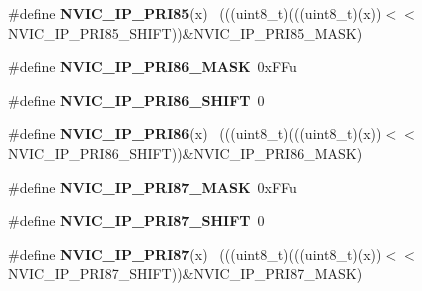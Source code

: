 \begin{DoxyCompactItemize}
\item 
\hypertarget{group___n_v_i_c___register___masks_ga6d9ceb14c27dc652c88da810f79b3d3e}{}\#define {\bfseries N\+V\+I\+C\+\_\+\+I\+P\+\_\+\+P\+R\+I85}(x)                                              ~(((uint8\+\_\+t)(((uint8\+\_\+t)(x))$<$$<$N\+V\+I\+C\+\_\+\+I\+P\+\_\+\+P\+R\+I85\+\_\+\+S\+H\+I\+F\+T))\&N\+V\+I\+C\+\_\+\+I\+P\+\_\+\+P\+R\+I85\+\_\+\+M\+A\+S\+K)\label{group___n_v_i_c___register___masks_ga6d9ceb14c27dc652c88da810f79b3d3e}

\item 
\hypertarget{group___n_v_i_c___register___masks_ga201cb65ea027bf541d40e002678f748f}{}\#define {\bfseries N\+V\+I\+C\+\_\+\+I\+P\+\_\+\+P\+R\+I86\+\_\+\+M\+A\+S\+K}~0x\+F\+Fu\label{group___n_v_i_c___register___masks_ga201cb65ea027bf541d40e002678f748f}

\item 
\hypertarget{group___n_v_i_c___register___masks_ga0a0518e1e197508a87093728906fb680}{}\#define {\bfseries N\+V\+I\+C\+\_\+\+I\+P\+\_\+\+P\+R\+I86\+\_\+\+S\+H\+I\+F\+T}~0\label{group___n_v_i_c___register___masks_ga0a0518e1e197508a87093728906fb680}

\item 
\hypertarget{group___n_v_i_c___register___masks_ga38594ad05f3a76313db7fa6e9ae3dffb}{}\#define {\bfseries N\+V\+I\+C\+\_\+\+I\+P\+\_\+\+P\+R\+I86}(x)                                              ~(((uint8\+\_\+t)(((uint8\+\_\+t)(x))$<$$<$N\+V\+I\+C\+\_\+\+I\+P\+\_\+\+P\+R\+I86\+\_\+\+S\+H\+I\+F\+T))\&N\+V\+I\+C\+\_\+\+I\+P\+\_\+\+P\+R\+I86\+\_\+\+M\+A\+S\+K)\label{group___n_v_i_c___register___masks_ga38594ad05f3a76313db7fa6e9ae3dffb}

\item 
\hypertarget{group___n_v_i_c___register___masks_gab59329bc7e590240f1591f41e3e6c403}{}\#define {\bfseries N\+V\+I\+C\+\_\+\+I\+P\+\_\+\+P\+R\+I87\+\_\+\+M\+A\+S\+K}~0x\+F\+Fu\label{group___n_v_i_c___register___masks_gab59329bc7e590240f1591f41e3e6c403}

\item 
\hypertarget{group___n_v_i_c___register___masks_gaccb6bc31b8c02a3f3286947ef4331bef}{}\#define {\bfseries N\+V\+I\+C\+\_\+\+I\+P\+\_\+\+P\+R\+I87\+\_\+\+S\+H\+I\+F\+T}~0\label{group___n_v_i_c___register___masks_gaccb6bc31b8c02a3f3286947ef4331bef}

\item 
\hypertarget{group___n_v_i_c___register___masks_ga643711ac78aebd175693039e0028e684}{}\#define {\bfseries N\+V\+I\+C\+\_\+\+I\+P\+\_\+\+P\+R\+I87}(x)                                              ~(((uint8\+\_\+t)(((uint8\+\_\+t)(x))$<$$<$N\+V\+I\+C\+\_\+\+I\+P\+\_\+\+P\+R\+I87\+\_\+\+S\+H\+I\+F\+T))\&N\+V\+I\+C\+\_\+\+I\+P\+\_\+\+P\+R\+I87\+\_\+\+M\+A\+S\+K)\label{group___n_v_i_c___register___masks_ga643711ac78aebd175693039e0028e684}


\end{DoxyCompactItemize}
